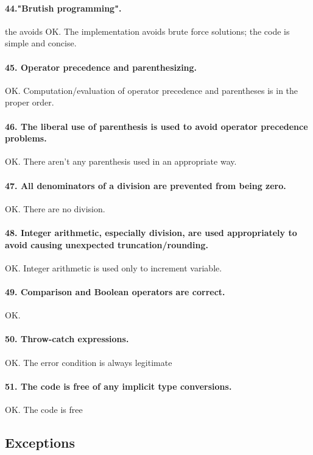 \documentclass[english]{article}
\begin{document}
\paragraph{44."Brutish programming".}the  avoids
OK. The implementation avoids brute force solutions; the code is simple and concise.

\paragraph{45. Operator precedence and parenthesizing.}
OK. Computation/evaluation of operator precedence and parentheses is in the proper order.
 
\paragraph{46. The liberal use of parenthesis is used to avoid operator precedence problems.}
OK. There aren't any parenthesis used in an appropriate way.

\paragraph{47. All denominators of a division are prevented from being zero.}
OK. There are no division.

\paragraph{48. Integer arithmetic, especially division, are used appropriately to avoid causing unexpected truncation/rounding.}
OK. Integer arithmetic is used only to increment variable.

\paragraph{49. Comparison and Boolean operators are correct.}
OK.

\paragraph{50. Throw-catch expressions.}
OK. The error condition is always legitimate

\paragraph{51. The code is free of any implicit type conversions.}
OK. The code is free 
\subsection{Exceptions}
\end{document}
